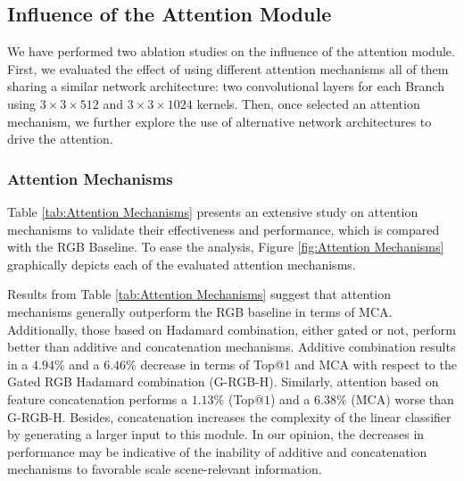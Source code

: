 \documentclass[review, 3p, sort&compress]{elsarticle}
\begin{document}
\subsection*{Influence of the Attention Module}
We have performed two ablation studies on the influence of the attention module. First, we evaluated the effect of using different attention mechanisms all of them sharing a similar network architecture: two convolutional layers for each Branch using \(3\times3\times512\) and \(3\times3\times1024\) kernels. Then, once selected an attention mechanism, we further explore the use of alternative network architectures to drive the attention. 
\subsubsection*{Attention Mechanisms}
Table \ref{tab:Attention Mechanisms} presents an extensive study on attention mechanisms to validate their effectiveness and performance, which is compared with the RGB Baseline. To ease the analysis, Figure \ref{fig:Attention Mechanisms} graphically depicts each of the evaluated attention mechanisms.

Results from Table \ref{tab:Attention Mechanisms} suggest that attention mechanisms generally outperform the RGB baseline in terms of MCA. Additionally, those based on Hadamard combination, either gated or not, perform better than additive and concatenation mechanisms. Additive combination results in a \(4.94\%\) and a \(6.46\%\) decrease in terms of Top@1 and MCA with respect to the Gated RGB Hadamard combination (G-RGB-H). Similarly, attention based on feature concatenation performs a \(1.13\%\) (Top@\(1\)) and a \(6.38\%\) (MCA) worse than G-RGB-H. Besides, concatenation increases the complexity of the linear classifier by generating a larger input to this module. In our opinion, the decreases in performance may be indicative of the inability of additive and concatenation mechanisms to favorable scale scene-relevant information.
\end{document}
